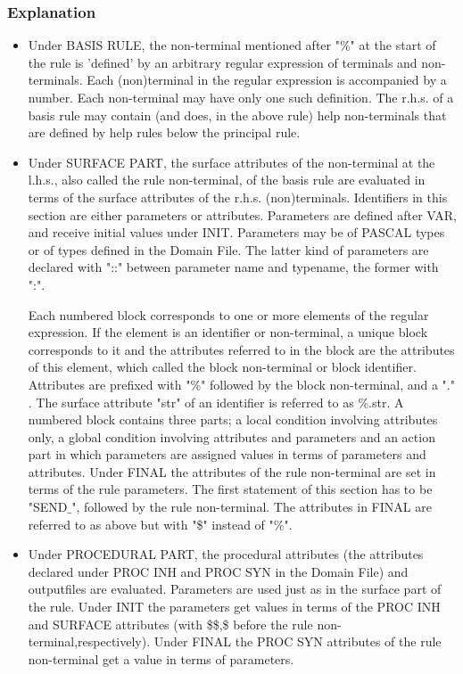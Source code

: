 \subsubsection{Explanation}
\begin{itemize}
\item
Under BASIS RULE, the non-terminal mentioned after "\%" at the start of the rule
is 'defined' by an arbitrary regular expression of terminals and non-terminals.
Each (non)terminal in the regular expression is accompanied by a number.
Each non-terminal may have only one such definition. The r.h.s. of a basis rule
may contain (and does, in the above rule) help non-terminals that are defined
by help rules below the principal rule.
\item
Under SURFACE PART, the surface attributes of the non-terminal at the l.h.s.,
also called the rule non-terminal,
of the basis rule are evaluated in terms of the surface attributes of the
r.h.s. (non)terminals. Identifiers in this section are either parameters or
attributes. Parameters are defined after VAR, and receive initial values under
INIT. Parameters may be of PASCAL types or of types defined in the Domain
File. The latter kind of parameters are declared with "::" between parameter
name and typename, the former with ":".

Each numbered block corresponds to one or more elements of the regular
expression. If the element is an identifier or non-terminal, a unique block
corresponds to it and the attributes referred to in the block are the attributes
of this element, which called the block non-terminal or block identifier.
Attributes are prefixed with "\%" followed by the block non-terminal, and
a "." . The surface attribute "str" of an identifier is referred to as \%.str.
A numbered block contains three parts; a local condition
involving attributes only, a global condition involving attributes
and parameters and an action part in which parameters are assigned values in
terms of parameters and attributes. Under FINAL the attributes of the rule
non-terminal are set in terms of the rule parameters. The first statement of
this section has to be "SEND$\_$", followed by the rule non-terminal. The
attributes in FINAL are referred to as above but with "\$" instead
of "\%".
\item
Under PROCEDURAL PART, the procedural attributes (the attributes declared
under PROC INH and PROC SYN in the Domain File) and outputfiles are evaluated.
Parameters are used just as in the surface part of the rule. Under INIT the
parameters get values in terms of the PROC INH and SURFACE
attributes (with \$\$,\$ before the rule non-terminal,respectively).
Under FINAL the PROC SYN attributes of the rule non-terminal get a value in
terms of parameters.


\end{itemize}
